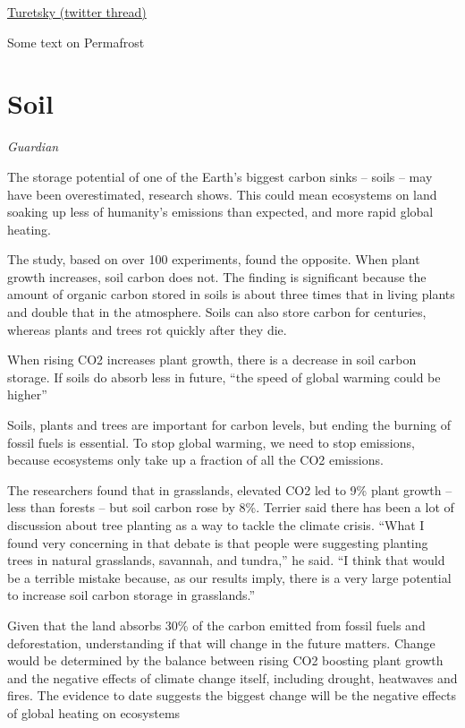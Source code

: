 \documentclass[
]{book}
\begin{document}
\href{https://twitter.com/queenofpeat/status/1473714739729551365}{Turetsky (twitter thread)}

Some text on Permafrost

\hypertarget{soil}{%
\chapter{Soil}\label{soil}}

\emph{Guardian}

The storage potential of one of the Earth's biggest carbon sinks -- soils -- may have been overestimated, research shows. This could mean ecosystems on land soaking up less of humanity's emissions than expected, and more rapid global heating.

The study, based on over 100 experiments, found the opposite. When plant growth increases, soil carbon does not. The finding is significant because the amount of organic carbon stored in soils is about three times that in living plants and double that in the atmosphere. Soils can also store carbon for centuries, whereas plants and trees rot quickly after they die.

When rising CO2 increases plant growth, there is a decrease in soil carbon storage.
If soils do absorb less in future, ``the speed of global warming could be higher''

Soils, plants and trees are important for carbon levels,
but ending the burning of fossil fuels is essential.
To stop global warming, we need to stop emissions,
because ecosystems only take up a fraction of all the CO2 emissions.

The researchers found that in grasslands, elevated CO2 led to 9\% plant growth -- less than forests -- but soil carbon rose by 8\%. Terrier said there has been a lot of discussion about tree planting as a way to tackle the climate crisis. ``What I found very concerning in that debate is that people were suggesting planting trees in natural grasslands, savannah, and tundra,'' he said. ``I think that would be a terrible mistake because, as our results imply, there is a very large potential to increase soil carbon storage in grasslands.''

Given that the land absorbs 30\% of the carbon emitted from fossil fuels and deforestation, understanding if that will change in the future matters.
Change would be determined by the balance between rising CO2 boosting plant growth and the negative effects of climate change itself, including drought, heatwaves and fires. The evidence to date suggests the biggest change will be the negative effects of global heating on ecosystems
\end{document}
